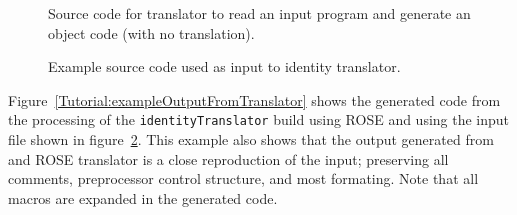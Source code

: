 \begin{figure}[!h]
{\indent
{\mySmallFontSize


\begin{latexonly}
   
\end{latexonly}

\begin{htmlonly}
   
\end{htmlonly}

}
}
\caption{Source code for translator to read an input program 
         and generate an object code (with no translation).}
\label{Tutorial:exampleIdentityTranslator}
\end{figure}

\begin{figure}[!h]
{\indent
{\mySmallFontSize


\begin{latexonly}
   
\end{latexonly}

\begin{htmlonly}
   
\end{htmlonly}

}
}
\caption{Example source code used as input to identity translator.}
\label{Tutorial:exampleInputCode_IdentityTranslator}
\end{figure}

Figure~\ref{Tutorial:exampleOutputFromTranslator} shows the generated code from the
processing of the {\tt identityTranslator} build using ROSE and using the input file
shown in figure~\ref{Tutorial:exampleInputCode_IdentityTranslator}.
This example also shows that the output generated from and ROSE translator is
a close reproduction of the input; preserving all comments, preprocessor
control structure, and most formating.  Note that all macros are expanded in
the generated code.

